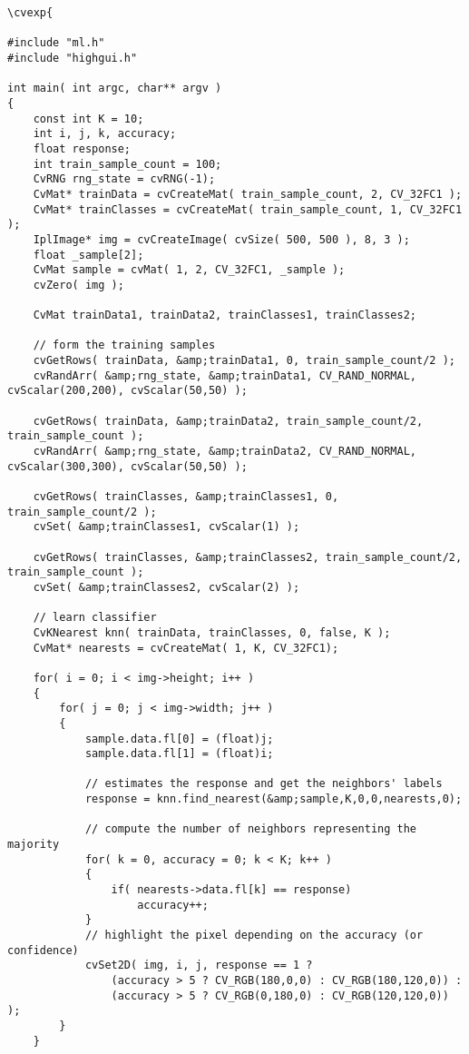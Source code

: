 \begin{verbatim}
\cvexp{

#include "ml.h"
#include "highgui.h"

int main( int argc, char** argv )
{
    const int K = 10;
    int i, j, k, accuracy;
    float response;
    int train_sample_count = 100;
    CvRNG rng_state = cvRNG(-1);
    CvMat* trainData = cvCreateMat( train_sample_count, 2, CV_32FC1 );
    CvMat* trainClasses = cvCreateMat( train_sample_count, 1, CV_32FC1 );
    IplImage* img = cvCreateImage( cvSize( 500, 500 ), 8, 3 );
    float _sample[2];
    CvMat sample = cvMat( 1, 2, CV_32FC1, _sample );
    cvZero( img );

    CvMat trainData1, trainData2, trainClasses1, trainClasses2;

    // form the training samples
    cvGetRows( trainData, &amp;trainData1, 0, train_sample_count/2 );
    cvRandArr( &amp;rng_state, &amp;trainData1, CV_RAND_NORMAL, cvScalar(200,200), cvScalar(50,50) );

    cvGetRows( trainData, &amp;trainData2, train_sample_count/2, train_sample_count );
    cvRandArr( &amp;rng_state, &amp;trainData2, CV_RAND_NORMAL, cvScalar(300,300), cvScalar(50,50) );

    cvGetRows( trainClasses, &amp;trainClasses1, 0, train_sample_count/2 );
    cvSet( &amp;trainClasses1, cvScalar(1) );

    cvGetRows( trainClasses, &amp;trainClasses2, train_sample_count/2, train_sample_count );
    cvSet( &amp;trainClasses2, cvScalar(2) );

    // learn classifier
    CvKNearest knn( trainData, trainClasses, 0, false, K );
    CvMat* nearests = cvCreateMat( 1, K, CV_32FC1);

    for( i = 0; i < img->height; i++ )
    {
        for( j = 0; j < img->width; j++ )
        {
            sample.data.fl[0] = (float)j;
            sample.data.fl[1] = (float)i;

            // estimates the response and get the neighbors' labels
            response = knn.find_nearest(&amp;sample,K,0,0,nearests,0);

            // compute the number of neighbors representing the majority
            for( k = 0, accuracy = 0; k < K; k++ )
            {
                if( nearests->data.fl[k] == response)
                    accuracy++;
            }
            // highlight the pixel depending on the accuracy (or confidence)
            cvSet2D( img, i, j, response == 1 ?
                (accuracy > 5 ? CV_RGB(180,0,0) : CV_RGB(180,120,0)) :
                (accuracy > 5 ? CV_RGB(0,180,0) : CV_RGB(120,120,0)) );
        }
    }


\end{verbatim}
